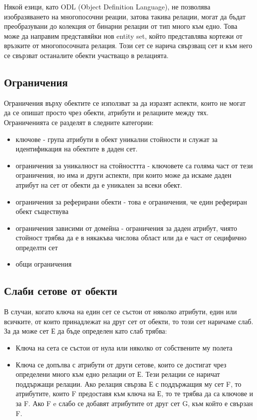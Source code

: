 \documentclass[fleqn,12pt]{article}
\begin{document}
    Някой езици, като ODL (Object Definition Language), не позволява изобразяването на многопосочни реации, затова такива релации, могат да бъдат преобразувани до колекция от бинарни релации от тип много към едно. Това може да направим представяйки нов entity set, който представлява кортежи от връзките от многопосочната релация. Този сет се нарича свързващ сет и към него се свързват останалите обекти участващо в релацията.


\subsection{Ограничения}
    Ограничения върху обектите се използват за да изразят аспекти, които не могат да се опишат просто чрез обекти, атрибути и релациите между тях. Ограниченията се разделят в следните категории:

\begin{itemize}
    \item ключове - група атрибути в обект уникални стойности и служат за идентификация на обектите в даден сет. 
    \item ограничения за уникалност на стойносттта - ключовете са голяма част от тези ограничения, но има и други аспекти, при които може да искаме даден атрибут на сет от обекти да е уникален за всеки обект.
    \item ограничения за реферирани обекти - това е ограничения, че един рефериран обект съществува
    \item ограничения зависими от домейна - ограничения за даден атрибут, чиято стойност трябва да е в някакъва числова област или да е част от сецифично определтн сет
    \item общи ограничения
\end{itemize}


\subsection{Слаби сетове от обекти}
В случаи, когато ключа на един сет се състои от няколко атрибути, един или всичките, от които принадлежат на друг сет от обекти, то този сет наричаме слаб. За да може сет Е да бъде определен като слаб трябва:

\begin{itemize}
	\item Ключа на сета се състои от нула или няколко от собствените му полета
	\item Ключа се допълва с атрибути от други сетове, които се достигат чрез определени много към едно релации от Е. Тези релации се наричат поддържащи релации. Ако релация свързва Е с поддържащия му сет F, то атрибутите, които F предоставя към ключа на Е, то те трябва да са ключове и за F. Ако F e слабо се добавят атрибутите от друг сет G, към който е свързан F.
\end{itemize}
\end{document}
